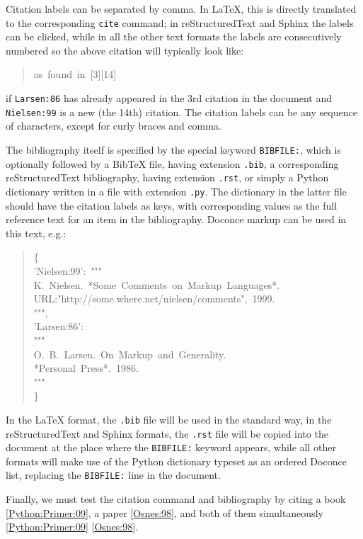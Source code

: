 \documentclass[a4paper,english]{article}
\begin{document}
Citation labels can be separated by comma. In LaTeX, this is directly
translated to the corresponding \texttt{cite} command; in reStructuredText
and Sphinx the labels can be clicked, while in all the other text
formats the labels are consecutively numbered so the above citation
will typically look like:
%
\begin{quote}{\ttfamily \raggedright \noindent
as~found~in~{[}3{]}{[}14{]}
}
\end{quote}

if \texttt{Larsen:86} has already appeared in the 3rd citation in the document
and \texttt{Nielsen:99} is a new (the 14th) citation. The citation labels
can be any sequence of characters, except for curly braces and comma.

The bibliography itself is specified by the special keyword \texttt{BIBFILE:},
which is optionally followed by a BibTeX file, having extension \texttt{.bib},
a corresponding reStructuredText bibliography, having extension \texttt{.rst},
or simply a Python dictionary written in a file with extension \texttt{.py}.
The dictionary in the latter file should have the citation labels as
keys, with corresponding values as the full reference text for an item
in the bibliography. Doconce markup can be used in this text, e.g.:
%
\begin{quote}{\ttfamily \raggedright \noindent
\{\\
'Nielsen:99':~"{}"{}"\\
K.~Nielsen.~*Some~Comments~on~Markup~Languages*.\\
URL:"http://some.where.net/nielsen/comments",~1999.\\
"{}"{}",\\
'Larsen:86':\\
"{}"{}"\\
O.~B.~Larsen.~On~Markup~and~Generality.\\
*Personal~Press*.~1986.\\
"{}"{}"\\
\}
}
\end{quote}

In the LaTeX format, the \texttt{.bib} file will be used in the standard way,
in the reStructuredText and Sphinx formats, the \texttt{.rst} file will be
copied into the document at the place where the \texttt{BIBFILE:} keyword
appears, while all other formats will make use of the Python dictionary
typeset as an ordered Doconce list, replacing the \texttt{BIBFILE:} line
in the document.

Finally, we must test the citation command and bibliography by
citing a book [\hyperlink{python-primer-09}{Python:Primer:09}], a paper [\hyperlink{osnes-98}{Osnes:98}],
and both of them simultaneously [\hyperlink{python-primer-09}{Python:Primer:09}] [\hyperlink{osnes-98}{Osnes:98}].
\end{document}
